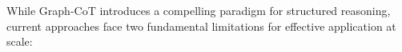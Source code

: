 While Graph-CoT introduces a compelling paradigm for structured reasoning, current approaches face two fundamental limitations for effective application at scale:






 

 

